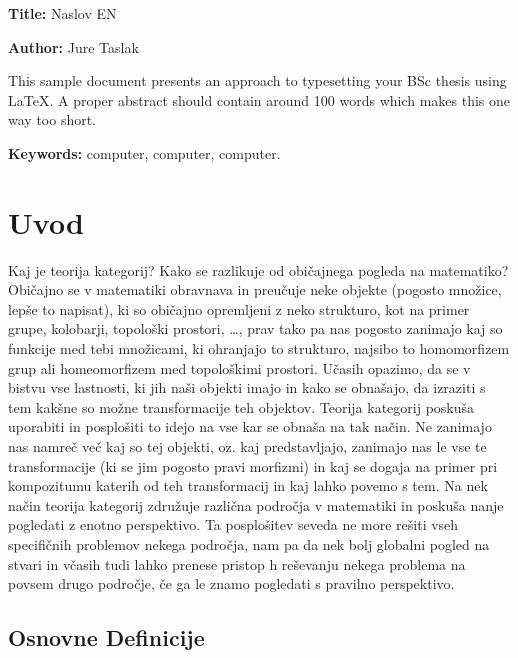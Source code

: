 \documentclass[12pt,a4paper]{book}
\newcommand{\ttitleEn}{Naslov EN}
\newcommand{\tauthor}{Jure Taslak}
\newcommand{\tkeywordsEn}{computer, computer, computer}
\newcommand{\clearemptydoublepage}{\newpage{\pagestyle{empty}\cleardoublepage}}
\theoremstyle{definition}
\theoremstyle{plain}
\theoremstyle{definition}
\theoremstyle{remark}
\begin{document}
\noindent\textbf{Title:} \ttitleEn
\bigskip

\noindent\textbf{Author:} \tauthor
\bigskip

\noindent This sample document presents an approach to typesetting your BSc thesis using \LaTeX. 
A proper abstract should contain around 100 words which makes this one way too short.
\bigskip

\noindent\textbf{Keywords:} \tkeywordsEn.
\clearemptydoublepage

\mainmatter
\setcounter{page}{1}
\pagestyle{fancy}

\chapter{Uvod}
Kaj je teorija kategorij? Kako se razlikuje od običajnega pogleda na matematiko? Običajno se v matematiki obravnava in preučuje neke objekte (pogosto množice, lepše to napisat), ki so običajno opremljeni z neko strukturo, kot na primer grupe, kolobarji, topološki prostori, \ldots, prav tako pa nas pogosto zanimajo kaj so funkcije med tebi množicami, ki ohranjajo to strukturo, najsibo to homomorfizem grup ali homeomorfizem med topološkimi prostori. Učasih opazimo, da se v bistvu vse lastnosti, ki jih naši objekti imajo in kako se obnašajo, da izraziti s tem kakšne so možne transformacije teh objektov. Teorija kategorij poskuša uporabiti in posplošiti to idejo na vse kar se obnaša na tak način. Ne zanimajo nas namreč več kaj so tej objekti, oz. kaj predstavljajo, zanimajo nas le vse te transformacije (ki se jim pogosto pravi morfizmi) in kaj se dogaja na primer pri kompozitumu katerih od teh transformacij in kaj lahko povemo s tem. Na nek način teorija kategorij združuje različna področja v matematiki in poskuša nanje pogledati z enotno perspektivo. Ta posplošitev seveda ne more rešiti vseh specifičnih problemov nekega področja, nam pa da nek bolj globalni pogled na stvari in včasih tudi lahko prenese pristop h reševanju nekega problema na povsem drugo področje, če ga le znamo pogledati s pravilno perspektivo.

\section{Osnovne Definicije}
\end{document}
